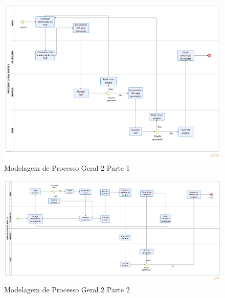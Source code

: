 \begin{apendicesenv}
    \begin{landscape}
        \begin{figure}[H]
            \centering
            \includegraphics[width=1.2\textwidth]{figuras/processoGeralParte21.png}
            \caption{Modelagem de Processo Geral 2 Parte 1}
            \label{img:modelagemProcessoGeral2Parte1}
        \end{figure}
    \end{landscape}

    \begin{landscape}
        \begin{figure}[H]
            \centering
            \includegraphics[width=1.3\textwidth]{figuras/processoGeralParte22.png}
            \caption{Modelagem de Processo Geral 2 Parte 2}
            \label{img:modelagemProcessoGeral2Parte2}
        \end{figure}
    \end{landscape}
    
\end{apendicesenv}